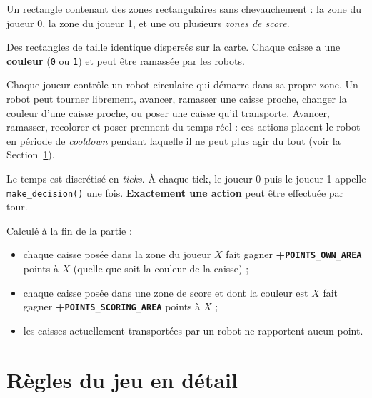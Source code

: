 \documentclass[11pt,a4paper]{article}
\newcommand{\code}[1]{\texttt{#1}}
\newcommand{\func}[1]{\texttt{#1}}
\begin{document}
\begin{description}[leftmargin=1.2cm,style=nextline]
    \item[La carte] Un rectangle contenant des zones rectangulaires sans 
        chevauchement : la zone du joueur 0, la zone du joueur 1, et une ou
        plusieurs \emph{zones de score}.
    \item[Caisses] Des rectangles de taille identique dispersés sur la
        carte. Chaque caisse a une \textbf{couleur} (\code{0} ou \code{1}) et
        peut être ramassée par les robots.
    \item[Robots] Chaque joueur contrôle un robot circulaire qui démarre
        dans sa propre zone. Un robot peut tourner librement, avancer,
        ramasser une caisse proche, changer la couleur d'une caisse proche, ou
        poser une caisse qu'il transporte.
        Avancer, ramasser, recolorer et poser prennent du temps réel : ces
        actions placent le robot en période de \emph{cooldown}
        pendant laquelle il ne peut plus agir du tout (voir la
        Section~\ref{sec:one-action}).
    \item[Tours] Le temps est discrétisé en \emph{ticks}. À chaque tick, le
        joueur 0 puis le joueur 1 appelle \func{make\_decision()} une fois.
        \textbf{Exactement une action} peut être effectuée par tour.
    \item[Score] Calculé à la fin de la partie :
        \begin{itemize}[nosep]
            \item chaque caisse posée dans la zone du joueur $X$
                  fait gagner \textbf{+\code{POINTS\_OWN\_AREA}} points à
                  $X$ (quelle que soit la couleur de la caisse) ;
            \item chaque caisse posée dans une zone de score et dont la
                  couleur est $X$ fait gagner
                  \textbf{+\code{POINTS\_SCORING\_AREA}} points à $X$ ;
            \item les caisses actuellement transportées par un robot ne
                  rapportent aucun point.
        \end{itemize}
\end{description}

\section{Règles du jeu en détail}
\label{sec:one-action}
\end{document}

